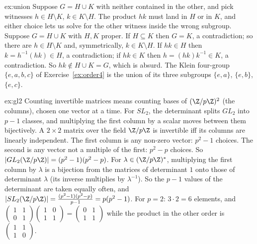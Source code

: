\begin{solution}{ex:union}
\idea Suppose $G=H\cup K$ with neither contained in the other, and pick witnesses $h\in H\setminus K$, $k\in K\setminus H$. The product $hk$ must land in $H$ or in $K$, and either choice lets us solve for the other witness inside the wrong subgroup.
\writeup Suppose $G=H\cup K$ with $H,K$ proper. If $H\subseteq K$ then $G=K$, a contradiction; so there are $h\in H\setminus K$ and, symmetrically, $k\in K\setminus H$. If $hk\in H$ then $k=h^{-1}(hk)\in H$, a contradiction; if $hk\in K$ then $h=(hk)k^{-1}\in K$, a contradiction. So $hk\notin H\cup K=G$, which is absurd.
The Klein four-group $\{e,a,b,c\}$ of Exercise~\ref{ex:order4} is the union of its three subgroups $\{e,a\}$, $\{e,b\}$, $\{e,c\}$.
\end{solution}

\begin{solution}{ex:gl2}
\idea Counting invertible matrices means counting bases of $(\Z/p\Z)^2$ (the columns), chosen one vector at a time. For $SL_2$, the determinant splits $GL_2$ into $p-1$ classes, and multiplying the first column by a scalar moves between them bijectively.
\writeup A $2\times2$ matrix over the field $\Z/p\Z$ is invertible iff its columns are linearly independent. The first column is any non-zero vector: $p^2-1$ choices. The second is any vector not a multiple of the first: $p^2-p$ choices. So $|GL_2(\Z/p\Z)|=(p^2-1)(p^2-p)$.
For $\lambda\in(\Z/p\Z)^*$, multiplying the first column by $\lambda$ is a bijection from the matrices of determinant $1$ onto those of determinant $\lambda$ (its inverse multiplies by $\lambda^{-1}$). So the $p-1$ values of the determinant are taken equally often, and $|SL_2(\Z/p\Z)|=\frac{(p^2-1)(p^2-p)}{p-1}=p(p^2-1)$.
For $p=2$: $3\cdot2=6$ elements, and $\begin{pmatrix}1&1\\0&1\end{pmatrix}\begin{pmatrix}1&0\\1&1\end{pmatrix}=\begin{pmatrix}0&1\\1&1\end{pmatrix}$ while the product in the other order is $\begin{pmatrix}1&1\\1&0\end{pmatrix}$.
\end{solution}

